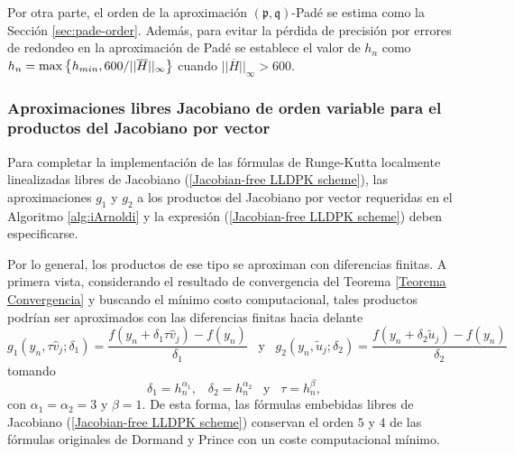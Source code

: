 Por otra parte, el orden de la aproximación $(\mathfrak{p},\mathfrak{q})$-Padé se estima como la Sección \ref{sec:pade-order}. Además, para evitar la pérdida de precisión por errores de redondeo en la aproximación de Padé se establece el valor de $h_n$ como $h_n=\max\left\{ h_{min},600/||\overline{H}||_\infty \right\}$ cuando $||\overline{H}||_\infty>600$.

\subsubsection{Aproximaciones libres Jacobiano de orden variable para el productos del Jacobiano por vector}
Para completar la implementación de las fórmulas de Runge-Kutta localmente linealizadas libres de Jacobiano (\ref{Jacobian-free LLDPK scheme}), las aproximaciones $g_1$ y $g_2$ a los productos del Jacobiano por vector requeridas en el Algoritmo \ref{alg:iArnoldi} y la expresión (\ref{Jacobian-free LLDPK scheme}) deben especificarse.

Por lo general, los productos de ese tipo se aproximan con diferencias finitas. A primera vista, considerando el resultado de convergencia del Teorema \ref{Teorema Convergencia} y buscando el mínimo costo computacional, tales productos podrían ser aproximados con las diferencias finitas hacia delante
\begin{equation}
	g_1(y_n,\tau \widehat{v}_j;\delta_1)=\frac{f(y_n+\delta_1 \tau \widehat{v}_j)-f(y_n)}{\delta_1}  \;\;\; \text{y} \;\;\; g_2(y_n,\widetilde{u}_j;\delta_2)=\frac{f(y_n+\delta_2  \widetilde{u}_j)-f(y_n)}{\delta_2} \label{FDO1}
 \end{equation}
tomando
\begin{equation}\label{deltaconstraint}
	\delta_1 = h_n^{\alpha_1}, \;\;\;  \delta_2 = h_n^{\alpha_2} \;\;\; \text{y} \;\;\; \tau=h_n^{\beta},
\end{equation}
con $\alpha_1=\alpha_2=3$ y $\beta=1$. De esta forma, las fórmulas embebidas libres de Jacobiano (\ref{Jacobian-free LLDPK scheme}) conservan el orden $5$ y $4$ de las fórmulas originales de Dormand y Prince con un coste computacional mínimo.

